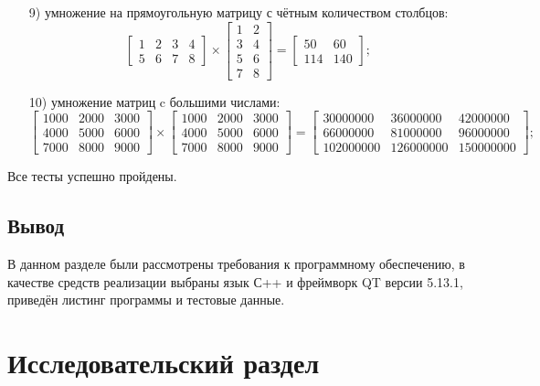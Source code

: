 \documentclass[a4paper,12pt]{article}
\begin{document}
\begin{enumerate}
	\item[9)] умножение на  прямоугольную матрицу с чётным количеством столбцов:
\[ \begin{bmatrix}
1 & 2 & 3 & 4\\
5 & 6 & 7 & 8
\end{bmatrix} \times 
\begin{bmatrix}
1 & 2 \\
3 & 4 \\
5 & 6 \\
7 & 8
\end{bmatrix} =
\begin{bmatrix}
50 & 60 \\
114 & 140
\end{bmatrix}; \]

	\item[10)] умножение матриц c большими числами:	
\[ \begin{bmatrix}
1000 & 2000 & 3000 \\
4000 & 5000 & 6000  \\
7000 & 8000 & 9000
\end{bmatrix} \times 
 \begin{bmatrix}
1000 & 2000 & 3000 \\
4000 & 5000 & 6000  \\
7000 & 8000 & 9000
\end{bmatrix} =
\begin{bmatrix}
30000000 & 36000000 & 42000000 \\
66000000 & 81000000 & 96000000 \\
102000000 & 126000000 & 150000000
\end{bmatrix}; \]

	\end{enumerate}
    	
    Все тесты успешно пройдены.
	

	
	
	\subsection*{Вывод}
	
	В данном разделе были рассмотрены требования к программному обеспечению, в качестве средств реализации выбраны язык С++ и фреймворк QT версии 5.13.1, приведён листинг программы и тестовые данные. 

\pagebreak

\section{Исследовательский раздел}
\end{document}
